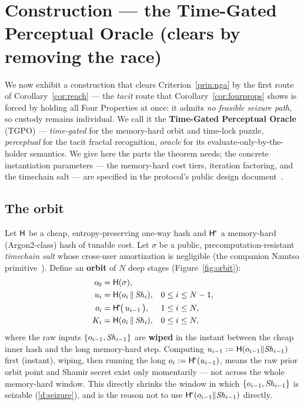 \section{Construction --- the Time-Gated Perceptual Oracle (clears by removing the race)}
\label{sec:gw}

We now exhibit a construction that clears Criterion~\ref{prin:nga} by the first
route of Corollary~\ref{cor:reach} --- the \emph{tacit} route that
Corollary~\ref{cor:fourprops} shows is forced by holding all Four Properties at
once: it admits \emph{no feasible seizure path}, so custody remains individual.
We call it the \textbf{Time-Gated Perceptual Oracle}
(TGPO) --- \emph{time-gated} for the memory-hard orbit and time-lock puzzle,
\emph{perceptual} for the tacit fractal recognition, \emph{oracle} for its
evaluate-only-by-the-holder semantics. We give here the
parts the theorem needs; the concrete instantiation parameters --- the
memory-hard cost tiers, iteration factoring, and the timechain salt --- are
specified in the protocol's public design document~\cite{gw-design}.

\subsection{The orbit}

Let $\mathsf{H}$ be a cheap, entropy-preserving one-way hash and $\mathsf{H}^{\!*}$ a
memory-hard (Argon2-class) hash of tunable cost. Let $\sigma$ be a public,
precomputation-resistant \emph{timechain salt} whose cross-user amortization is
negligible (the companion Namtso primitive~\cite{gw-timechain-salt}). Define an
\textbf{orbit} of $N$ deep stages (Figure~\ref{fig:orbit}):
\begin{align}
  o_0 &= \mathsf{H}(\sigma),                && \\
  u_i &= \mathsf{H}(o_{i} \,\|\, \mathit{Sh}_{i}),  && 0 \le i \le N-1, \\
  o_i &= \mathsf{H}^{\!*}\!\big(\, u_{i-1} \,\big), && 1 \le i \le N, \\
  K_i &= \mathsf{H}(o_i \,\|\, \mathit{Sh}_i),      && 0 \le i \le N,
  \label{eq:orbit}
\end{align}
where the raw inputs $\{o_{i-1}, \mathit{Sh}_{i-1}\}$ are \textbf{wiped} in the instant
between the cheap inner hash and the long memory-hard step. Computing
$u_{i-1} := \mathsf{H}(o_{i-1}\|\mathit{Sh}_{i-1})$ first (instant), wiping, then running the
long $o_i := \mathsf{H}^{\!*}(u_{i-1})$, means the raw prior orbit point and Shamir secret exist
only momentarily --- not across the whole memory-hard window. This directly
shrinks the window in which $\{o_{i-1},\mathit{Sh}_{i-1}\}$ is seizable (\ref{d:seizure}),
and is the reason not to use $\mathsf{H}^{\!*}(o_{i-1}\|\mathit{Sh}_{i-1})$ directly.

